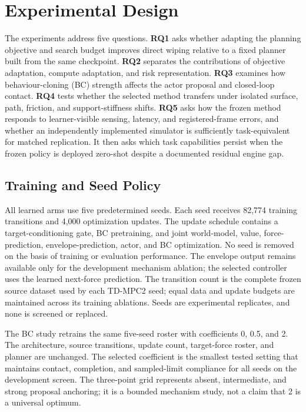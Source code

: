 \section{Experimental Design}
\label{sec:experimental_design}

The experiments address five questions. \textbf{RQ1} asks whether adapting
the planning objective and search budget improves direct wiping relative to a
fixed planner built from the same checkpoint. \textbf{RQ2} separates the
contributions of objective adaptation, compute adaptation, and risk
representation. \textbf{RQ3} examines how behaviour-cloning (BC)
strength affects the actor proposal and closed-loop contact. \textbf{RQ4}
tests whether the selected method transfers under isolated surface, path,
friction, and support-stiffness shifts. \textbf{RQ5} asks how the frozen
method responds to learner-visible sensing, latency, and registered-frame
errors, and whether an independently implemented simulator is sufficiently
task-equivalent for matched replication. It then asks which task capabilities
persist when the frozen policy is deployed zero-shot despite a documented
residual engine gap.

\subsection{Training and Seed Policy}

All learned arms use five predetermined seeds. Each seed receives 82,774
training transitions and 4,000 optimization updates. The update schedule
contains a target-conditioning gate, BC pretraining, and joint world-model,
value, force-prediction, envelope-prediction, actor, and BC optimization. No
seed is removed on the basis of training or evaluation performance. The
envelope output remains available only for the development mechanism
ablation; the selected controller uses the learned next-force prediction.
The transition count is the complete frozen source dataset used by each
TD-MPC2 seed; equal data and update budgets are maintained across its training
ablations. Seeds are experimental replicates, and none is screened or replaced.

The BC study retrains the same five-seed roster with coefficients 0, 0.5, and
2. The architecture, source transitions, update count, target-force roster,
and planner are unchanged. The selected coefficient is the smallest tested
setting that maintains contact, completion, and sampled-limit compliance for
all seeds on the development screen.
The three-point grid represents absent, intermediate, and strong proposal
anchoring; it is a bounded mechanism study, not a claim that 2 is a universal
optimum.

